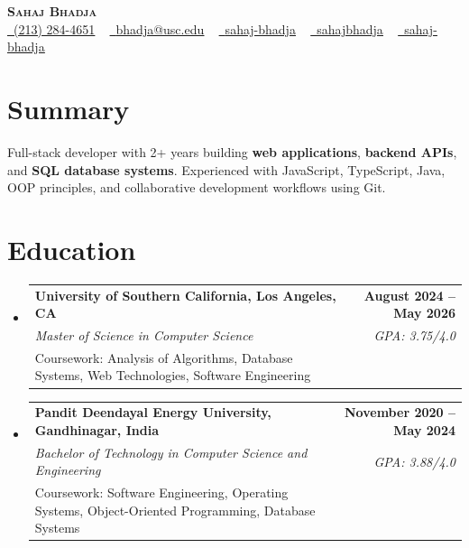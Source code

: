 \documentclass[letterpaper,10pt]{article}
\makeatletter
\newcommand{\resumeEduSubheading}[5]{\vspace{-1pt}\item\begin{tabular*}{1.0\textwidth}[t]{l@{\extracolsep{\fill}}r}\textbf{#1} & \textbf{\small #2} \\\textit{\small #3} & \textit{\small #4} \\\small #5 & \\\end{tabular*}\vspace{-4pt}}
\newcommand{\resumeSubHeadingListStart}{\begin{itemize}[leftmargin=0.0in, label={}]}
\newcommand{\resumeSubHeadingListEnd}{\end{itemize}}
\makeatother
\begin{document}
\begin{center}
{\Huge \scshape \textbf{Sahaj Bhadja}} \\ \vspace{1pt}
\small \href{tel:(213) 284-4651}{\faPhone\ \underline{(213) 284-4651}} ~ \href{mailto:bhadja@usc.edu}{\raisebox{-0.2\height}\faEnvelope\ \underline{bhadja@usc.edu}} ~
\href{https://www.linkedin.com/in/sahaj-bhadja/}{\raisebox{-0.2\height}\faLinkedin\ \underline{sahaj-bhadja}} ~ \href{https://github.com/SAHAJ-BHADJA}{\raisebox{-0.2\height}\faGithub\ \underline{sahajbhadja}} ~
\href{https://sahaj-bhadja.vercel.app/}{\raisebox{-0.2\height}\faGlobe\ \underline{sahaj-bhadja}}
\end{center}
\vspace{-18pt}
\section{Summary}
\begin{itemize}[leftmargin=0.15in, label={}]
\small{\item{Full-stack developer with 2+ years building \textbf{web applications}, \textbf{backend APIs}, and \textbf{SQL database systems}. Experienced with JavaScript, TypeScript, Java, OOP principles, and collaborative development workflows using Git.}}
\end{itemize}
\vspace{-16pt}
\section{Education}
\resumeSubHeadingListStart
\resumeEduSubheading{University of Southern California, Los Angeles, CA}{August 2024 -- May 2026}{Master of Science in Computer Science}{GPA: 3.75/4.0}{Coursework: Analysis of Algorithms, Database Systems, Web Technologies, Software Engineering}
\vspace{-9pt}
\resumeEduSubheading{Pandit Deendayal Energy University, Gandhinagar, India}{November 2020 -- May 2024}{Bachelor of Technology in Computer Science and Engineering}{GPA: 3.88/4.0}{Coursework: Software Engineering, Operating Systems, Object-Oriented Programming, Database Systems}
\resumeSubHeadingListEnd
\vspace{-14pt}
\end{document}

